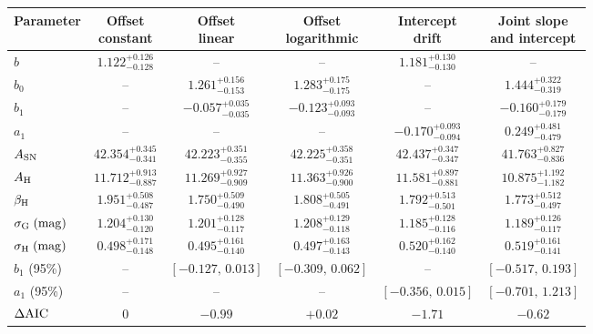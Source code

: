 \begin{tabular}{@{}lccccc@{}}
\toprule
Parameter & \shortstack{Offset\\constant} & \shortstack{Offset\\linear} & \shortstack{Offset\\logarithmic} & \shortstack{Intercept\\drift} & \shortstack{Joint slope\\and intercept} \\
\midrule
$b$ & $1.122^{+0.126}_{-0.128}$ & -- & -- & $1.181^{+0.130}_{-0.130}$ & -- \\
$b_0$ & -- & $1.261^{+0.156}_{-0.153}$ & $1.283^{+0.175}_{-0.175}$ & -- & $1.444^{+0.322}_{-0.319}$ \\
$b_1$ & -- & $-0.057^{+0.035}_{-0.035}$ & $-0.123^{+0.093}_{-0.093}$ & -- & $-0.160^{+0.179}_{-0.179}$ \\
$a_1$ & -- & -- & -- & $-0.170^{+0.093}_{-0.094}$ & $0.249^{+0.481}_{-0.479}$ \\
$A_{\rm SN}$ & $42.354^{+0.345}_{-0.341}$ & $42.223^{+0.351}_{-0.355}$ & $42.225^{+0.358}_{-0.351}$ & $42.437^{+0.347}_{-0.347}$ & $41.763^{+0.827}_{-0.836}$ \\
$A_{\rm H}$ & $11.712^{+0.913}_{-0.887}$ & $11.269^{+0.927}_{-0.909}$ & $11.363^{+0.926}_{-0.900}$ & $11.581^{+0.897}_{-0.881}$ & $10.875^{+1.192}_{-1.182}$ \\
$\beta_{\rm H}$ & $1.951^{+0.508}_{-0.487}$ & $1.750^{+0.509}_{-0.490}$ & $1.808^{+0.505}_{-0.491}$ & $1.792^{+0.513}_{-0.501}$ & $1.773^{+0.512}_{-0.497}$ \\
$\sigma_{\rm G}\;({\rm mag})$ & $1.204^{+0.130}_{-0.120}$ & $1.201^{+0.128}_{-0.117}$ & $1.208^{+0.129}_{-0.118}$ & $1.185^{+0.128}_{-0.116}$ & $1.189^{+0.126}_{-0.117}$ \\
$\sigma_{\rm H}\;({\rm mag})$ & $0.498^{+0.171}_{-0.148}$ & $0.495^{+0.161}_{-0.140}$ & $0.497^{+0.163}_{-0.143}$ & $0.520^{+0.162}_{-0.140}$ & $0.519^{+0.161}_{-0.141}$ \\
\midrule
$b_1$ (95\%) & -- & $[-0.127,\,0.013]$ & $[-0.309,\,0.062]$ & -- & $[-0.517,\,0.193]$ \\
$a_1$ (95\%) & -- & -- & -- & $[-0.356,\,0.015]$ & $[-0.701,\,1.213]$ \\
$\Delta{\rm AIC}$ & $0$ & $-0.99$ & $+0.02$ & $-1.71$ & $-0.62$ \\
\bottomrule
\end{tabular}
